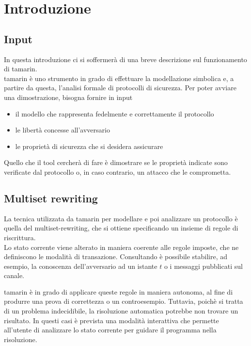 \section{Introduzione}

\subsection{Input}

In questa introduzione ci si soffermerà di una breve descrizione sul funzionamento di \gls{tamarin}. \\
\gls{tamarin} è uno strumento in grado di effettuare la modellazione simbolica e, a partire da questa, l'analisi formale di protocolli di sicurezza.
Per poter avviare una dimostrazione, bisogna fornire in input
\begin{itemize}
    \item il modello che rappresenta fedelmente e correttamente il protocollo
    \item le libertà concesse all'avversario
    \item le proprietà di sicurezza che si desidera assicurare
\end{itemize}
Quello che il tool cercherà di fare è dimostrare se le proprietà indicate sono verificate dal protocollo o, in caso contrario, un attacco che le comprometta. \\

\subsection{Multiset rewriting}
La tecnica utilizzata da \gls{tamarin} per modellare e poi analizzare un protocollo è quella del \gls{multiset-rewriting}, che si ottiene specificando un insieme di regole di riscrittura. \\

Lo stato corrente viene alterato in maniera coerente alle regole imposte, che ne definiscono le modalità di transazione.
Consultando è possibile stabilire, ad esempio, la conoscenza dell'avversario ad un istante $t$ o i messaggi pubblicati sul canale.

\gls{tamarin} è in grado di applicare queste regole in maniera autonoma, al fine di produrre una prova di correttezza o un controesempio.
Tuttavia, poichè si tratta di un problema indecidibile, la risoluzione automatica potrebbe non trovare un risultato.
In questi casi è prevista una modalità interattiva che permette all'utente di analizzare lo stato corrente per guidare il programma nella risoluzione.